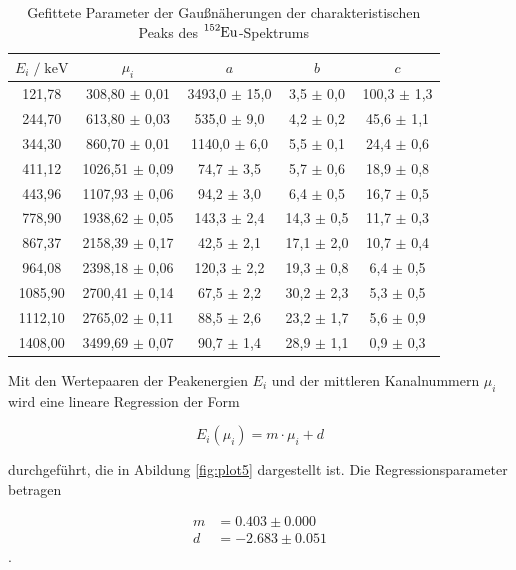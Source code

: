 \begin{table}
  \centering
  \caption{Gefittete Parameter der Gaußnäherungen der charakteristischen Peaks des $\ce{^{152}Eu}$-Spektrums}
  \label{tab:mess1}
  \begin{tabular}{c c c c c}
  \toprule
  $ E_i \;/\; \si{\kilo\eV}$ & $\mu_i$ & $a$ & $b$ & $c$ \\
  \midrule
        121,78 &  308,80 $\pm$ 0,01 & 3493,0 $\pm$ 15,0 &  3,5 $\pm$ 0,0 & 100,3 $\pm$ 1,3 \\
        244,70 &  613,80 $\pm$ 0,03 &  535,0 $\pm$  9,0 &  4,2 $\pm$ 0,2 &  45,6 $\pm$ 1,1 \\
        344,30 &  860,70 $\pm$ 0,01 & 1140,0 $\pm$  6,0 &  5,5 $\pm$ 0,1 &  24,4 $\pm$ 0,6 \\
        411,12 & 1026,51 $\pm$ 0,09 &   74,7 $\pm$  3,5 &  5,7 $\pm$ 0,6 &  18,9 $\pm$ 0,8 \\
        443,96 & 1107,93 $\pm$ 0,06 &   94,2 $\pm$  3,0 &  6,4 $\pm$ 0,5 &  16,7 $\pm$ 0,5 \\
        778,90 & 1938,62 $\pm$ 0,05 &  143,3 $\pm$  2,4 & 14,3 $\pm$ 0,5 &  11,7 $\pm$ 0,3 \\
        867,37 & 2158,39 $\pm$ 0,17 &   42,5 $\pm$  2,1 & 17,1 $\pm$ 2,0 &  10,7 $\pm$ 0,4 \\
        964,08 & 2398,18 $\pm$ 0,06 &  120,3 $\pm$  2,2 & 19,3 $\pm$ 0,8 &   6,4 $\pm$ 0,5 \\
       1085,90 & 2700,41 $\pm$ 0,14 &   67,5 $\pm$  2,2 & 30,2 $\pm$ 2,3 &   5,3 $\pm$ 0,5 \\
       1112,10 & 2765,02 $\pm$ 0,11 &   88,5 $\pm$  2,6 & 23,2 $\pm$ 1,7 &   5,6 $\pm$ 0,9 \\
       1408,00 & 3499,69 $\pm$ 0,07 &   90,7 $\pm$  1,4 & 28,9 $\pm$ 1,1 &   0,9 $\pm$ 0,3 \\
  \bottomrule
  \end{tabular}
  \end{table}

Mit den Wertepaaren der Peakenergien $E_i$ und der mittleren Kanalnummern $\mu_i$ wird eine lineare Regression der Form

\begin{equation}
  E_i(\mu_i) = m \cdot \mu_i + d
\end{equation}
  
durchgeführt, die in Abildung \ref{fig:plot5} dargestellt ist.
Die Regressionsparameter betragen

\begin{align*}
  m &= 0.403 \pm 0.000 \\
  d &= -2.683 \pm 0.051
\end{align*} \; .

